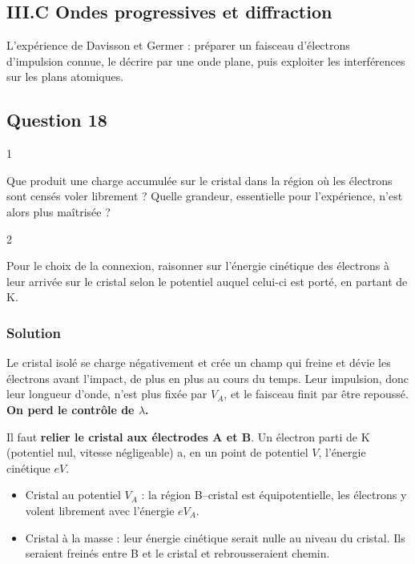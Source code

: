 \documentclass[11pt,a4paper]{article}
\providecommand{\tightlist}{\setlength{\itemsep}{0pt}\setlength{\parskip}{0pt}}
\begin{document}
\hypertarget{iii.c-ondes-progressives-et-diffraction}{%
\subsection{III.C Ondes progressives et diffraction}\label{iii.c-ondes-progressives-et-diffraction}}

L'expérience de Davisson et Germer : préparer un faisceau d'électrons d'impulsion connue, le décrire par une onde plane, puis exploiter les interférences sur les plans atomiques.

\hypertarget{question-18}{%
\subsection{Question 18}\label{question-18}}

\begin{indication}{1}

Que produit une charge accumulée sur le cristal dans la région où les électrons sont censés voler librement ? Quelle grandeur, essentielle pour l'expérience, n'est alors plus maîtrisée ?

\end{indication}

\begin{indication}{2}

Pour le choix de la connexion, raisonner sur l'énergie cinétique des électrons à leur arrivée sur le cristal selon le potentiel auquel celui-ci est porté, en partant de K.

\end{indication}

\hypertarget{solution-17}{%
\subsubsection{Solution}\label{solution-17}}

Le cristal isolé se charge négativement et crée un champ qui freine et dévie les électrons avant l'impact, de plus en plus au cours du temps. Leur impulsion, donc leur longueur d'onde, n'est plus fixée par \(V_A\), et le faisceau finit par être repoussé. \textbf{On perd le contrôle de \(\lambda\).}

Il faut \textbf{relier le cristal aux électrodes A et B}. Un électron parti de K (potentiel nul, vitesse négligeable) a, en un point de potentiel \(V\), l'énergie cinétique \(eV\).

\begin{itemize}
\tightlist
\item
  Cristal au potentiel \(V_A\) : la région B--cristal est équipotentielle, les électrons y volent librement avec l'énergie \(eV_A\).
\item
  Cristal à la masse : leur énergie cinétique serait nulle au niveau du cristal. Ils seraient freinés entre B et le cristal et rebrousseraient chemin.
\end{itemize}
\end{document}
